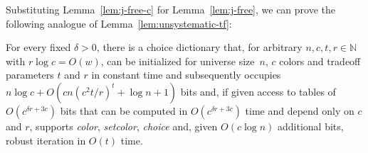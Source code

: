 \documentclass[envcountsame,envcountsect,undated,nolinenumbers]{lnthi}
\def\Tvn#1{\hbox{\textit{#1\/}}}
\def\TbbbN{\mathbb{N}}
\begin{document}
Substituting Lemma~\ref{lem:j-free-c} for
Lemma~\ref{lem:j-free},
we can prove the following analogue
of Lemma~\ref{lem:unsystematic-tf}:

\begin{lemma}
\label{lem:unsystematic-tc}For every fixed $\delta>0$,
there is a choice dictionary that, for
arbitrary $n,c,t,r\in\TbbbN$ with $r\log c=O(w)$,
can be initialized for universe size~$n$,
$c$ colors and tradeoff parameters $t$ and $r$
in constant time and subsequently occupies
$n\log c+O(c n({{c^2 t}/r})^t+\log n+1)$
bits and,
if given access to tables of
$O(c^{\delta r+3 c})$ bits
that can be computed in $O(c^{\delta r+3 c})$
time and depend only on $c$ and $r$,
supports \Tvn{color}, \Tvn{setcolor},
\Tvn{choice} and,
given $O(c\log n)$ additional bits,
robust iteration in $O(t)$ time.
\end{lemma}
\end{document}
